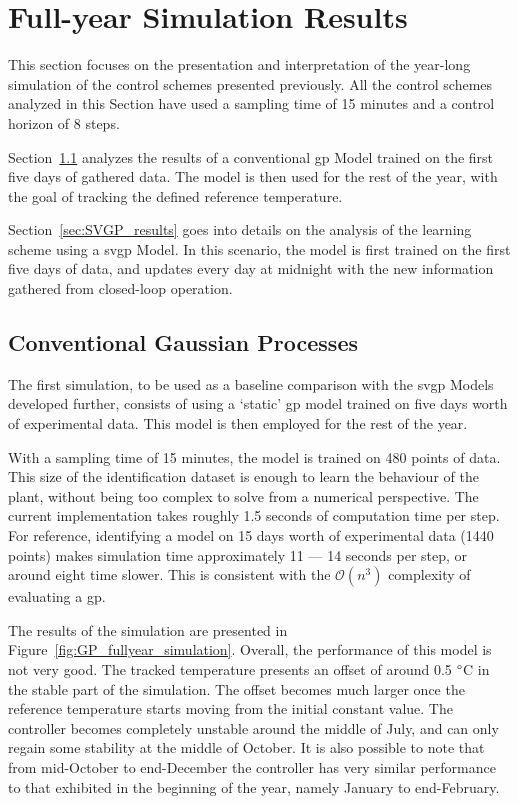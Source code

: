 \section{Full-year Simulation Results}\label{sec:results}


This section focuses on the presentation and interpretation of the year-long
simulation of the control schemes presented previously. All the control schemes
analyzed in this Section have used a sampling time of 15 minutes and a control
horizon of 8 steps.

Section~\ref{sec:GP_results} analyzes the results of a conventional
\acrlong{gp} Model trained on the first five days of gathered data. The model
is then used for the rest of the year, with the goal of tracking the defined
reference temperature.

Section~\ref{sec:SVGP_results} goes into details on the analysis of the learning
scheme using a \acrshort{svgp} Model. In this scenario, the model is first
trained on the first five days of data, and updates every day at midnight with
the new information gathered from closed-loop operation.

\subsection{Conventional Gaussian Processes}\label{sec:GP_results}

The first simulation, to be used as a baseline comparison with the
\acrshort{svgp} Models developed further, consists of using a `static'
\acrshort{gp} model trained on five days worth of experimental data. This model
is then employed for the rest of the year.

With a sampling time of 15 minutes, the model is trained on 480 points of data.
This size of the identification dataset is enough to learn the behaviour of the
plant, without being too complex to solve from a numerical perspective. The
current implementation takes roughly 1.5 seconds of computation time per step.
For reference, identifying a model on 15 days worth of experimental data (1440
points) makes simulation time approximately 11 --- 14 seconds per step, or
around eight time slower. This is consistent with the $\mathcal{O}(n^3)$
complexity of evaluating a \acrshort{gp}.

The results of the simulation are presented in
Figure~\ref{fig:GP_fullyear_simulation}. Overall, the performance of this model
is not very good. The tracked temperature presents an offset of around 0.5
$\degree$C in the stable part of the simulation. The offset becomes much larger
once the reference temperature starts moving from the initial constant value.
The controller becomes completely unstable around the middle of July, and can
only regain some stability at the middle of October. It is also possible to note
that from mid-October to end-December the controller has very similar
performance to that exhibited in the beginning of the year, namely January to
end-February.


